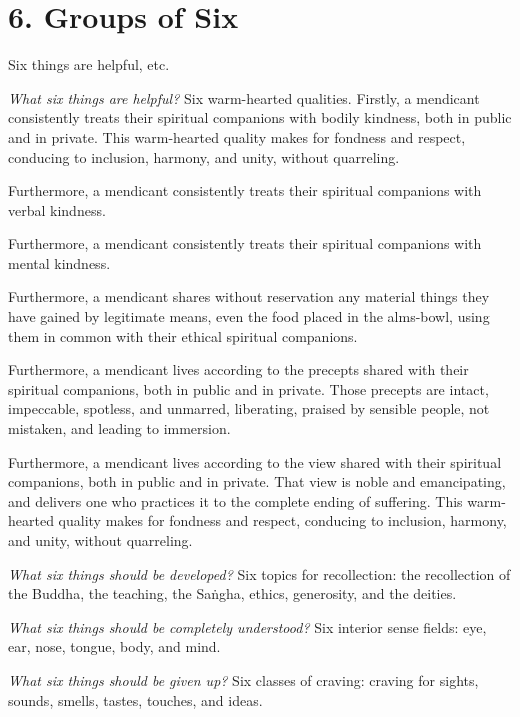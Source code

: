 \documentclass[12pt,openany]{book}%
\begin{document}
\section*{6. Groups of Six }

Six things are helpful, etc. 

\emph{What six things are helpful?} Six warm-hearted qualities. Firstly, a mendicant consistently treats their spiritual companions with bodily kindness, both in public and in private. This warm-hearted quality makes for fondness and respect, conducing to inclusion, harmony, and unity, without quarreling. 

Furthermore, a mendicant consistently treats their spiritual companions with verbal kindness. 

Furthermore, a mendicant consistently treats their spiritual companions with mental kindness. 

Furthermore, a mendicant shares without reservation any material things they have gained by legitimate means, even the food placed in the alms-bowl, using them in common with their ethical spiritual companions. 

Furthermore, a mendicant lives according to the precepts shared with their spiritual companions, both in public and in private. Those precepts are intact, impeccable, spotless, and unmarred, liberating, praised by sensible people, not mistaken, and leading to immersion. 

Furthermore, a mendicant lives according to the view shared with their spiritual companions, both in public and in private. That view is noble and emancipating, and delivers one who practices it to the complete ending of suffering. This warm-hearted quality makes for fondness and respect, conducing to inclusion, harmony, and unity, without quarreling. 

\emph{What six things should be developed?} Six topics for recollection: the recollection of the Buddha, the teaching, the \textsanskrit{Saṅgha}, ethics, generosity, and the deities. 

\emph{What six things should be completely understood?} Six interior sense fields: eye, ear, nose, tongue, body, and mind. 

\emph{What six things should be given up?} Six classes of craving: craving for sights, sounds, smells, tastes, touches, and ideas. 
\end{document}
